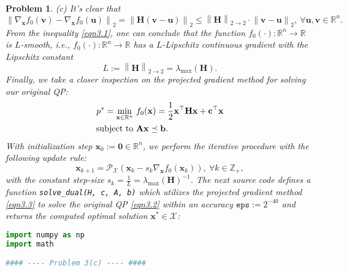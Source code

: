 \documentclass[11pt]{article}
\newtheorem{problem}{Problem}
\begin{document}
\begin{problem}
{\indent (c) It's clear that
\begin{equation}
    \label{eqn3.1}
    \left\| \nabla_{\mathbf{x}} f_0 (\mathbf{v}) - \nabla_{\mathbf{x}} f_0 (\mathbf{u}) \right\|_{2} 
    = \left\| \mathbf{H} \left( \mathbf{v} - \mathbf{u} \right) \right\|_2
    \leq \left\| \mathbf{H} \right\|_{2 \to 2} \cdot \left\| \mathbf{v} - \mathbf{u} \right\|_2,\ \forall \mathbf{u}, \mathbf{v} \in \mathbb{R}^n.
\end{equation}
From the inequality \eqref{eqn3.1}, one can conclude that the function $f_0 (\cdot) : \mathbb{R}^n \rightarrow \mathbb{R}$ is $L$-smooth, \emph{i.e.}, $f_0 (\cdot) : \mathbb{R}^n \rightarrow \mathbb{R}$ has a $L$-Lipschitz continuous gradient with the Lipschitz constant
\begin{equation*}
    L := \left\| \mathbf{H} \right\|_{2 \to 2} = \lambda_{\max} ( \mathbf{H} ).
\end{equation*}
\indent Finally, we take a closer inspection on the projected gradient method for solving our original QP:
\begin{equation}
    \label{eqn3.2}
    \begin{split}
        p^* = \min_{\mathbf{x} \in \mathbb{R}^n} \ & f_0 (\mathbf{x}) = \frac{1}{2} \mathbf{x}^{\top} \mathbf{H} \mathbf{x} + \mathbf{c}^{\top} \mathbf{x} \\
        \textnormal{subject to } & \mathbf{Ax} \preceq \mathbf{b}.
    \end{split}
\end{equation}
\noindent With initialization step $\mathbf{x}_0 := \mathbf{0} \in \mathbb{R}^n$, we perform the iterative procedure with the following update rule:
\begin{equation}
    \label{eqn3.3}
    \mathbf{x}_{k+1} = \mathcal{P}_{\mathcal{X}} \left( \mathbf{x}_k - s_k \nabla_{\mathbf{x}} f_0 \left( \mathbf{x}_k \right) \right),\ \forall k \in \mathbb{Z}_{+},
\end{equation}
with the constant step-size $s_k = \frac{1}{L} = \lambda_{\max} (\mathbf{H})^{-1}$. The next source code defines a function \texttt{solve\_dual(H, c, A, b)} which utilizes the projected gradient method \eqref{eqn3.3} to solve the original QP \eqref{eqn3.2} within an accuracy $\texttt{eps} := 2^{-40}$ and returns the computed optimal solution $\mathbf{x}^* \in \mathcal{X}$:

\begin{lstlisting}[language = Python]
import numpy as np
import math

#### ---- Problem 3(c) ---- ####


\end{lstlisting}}
\end{problem}
\end{document}
